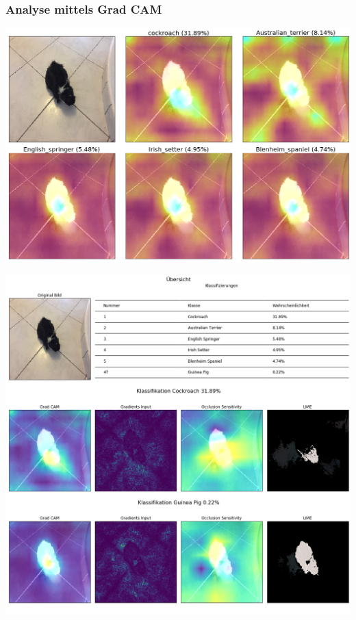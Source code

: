 \documentclass[
  12pt, %
  a4paper, %
  oneside, %
  openany, 
  numbers=noenddot, %
  BCOR=5mm, %
  parskip=half*, %
  thesis, %
]{bfhbook}
\begin{document}
\subsubsection*{Analyse mittels Grad CAM}
\break
\begin{center}
\begin{minipage}[t]{\linewidth}
\includegraphics[width=\textwidth]{Bilder/Oreo-Grad-Cam-Classes.png}
\end{minipage}
\end{center}

\begin{center}
\begin{minipage}[t]{\linewidth}
\includegraphics[width=\textwidth]{Bilder/Oreo-Classification.png}
\end{minipage}
\end{center}
\end{document}
